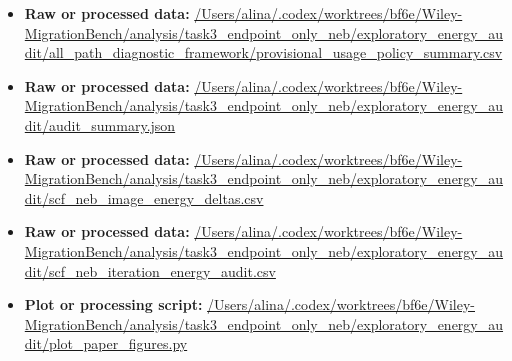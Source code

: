 \begin{itemize}[leftmargin=1.4em,noitemsep]
\item \textbf{Raw or processed data:} \url{/Users/alina/.codex/worktrees/bf6e/Wiley-MigrationBench/analysis/task3_endpoint_only_neb/exploratory_energy_audit/all_path_diagnostic_framework/provisional_usage_policy_summary.csv}
\item \textbf{Raw or processed data:} \url{/Users/alina/.codex/worktrees/bf6e/Wiley-MigrationBench/analysis/task3_endpoint_only_neb/exploratory_energy_audit/audit_summary.json}
\item \textbf{Raw or processed data:} \url{/Users/alina/.codex/worktrees/bf6e/Wiley-MigrationBench/analysis/task3_endpoint_only_neb/exploratory_energy_audit/scf_neb_image_energy_deltas.csv}
\item \textbf{Raw or processed data:} \url{/Users/alina/.codex/worktrees/bf6e/Wiley-MigrationBench/analysis/task3_endpoint_only_neb/exploratory_energy_audit/scf_neb_iteration_energy_audit.csv}
\item \textbf{Plot or processing script:} \url{/Users/alina/.codex/worktrees/bf6e/Wiley-MigrationBench/analysis/task3_endpoint_only_neb/exploratory_energy_audit/plot_paper_figures.py}
\end{itemize}
